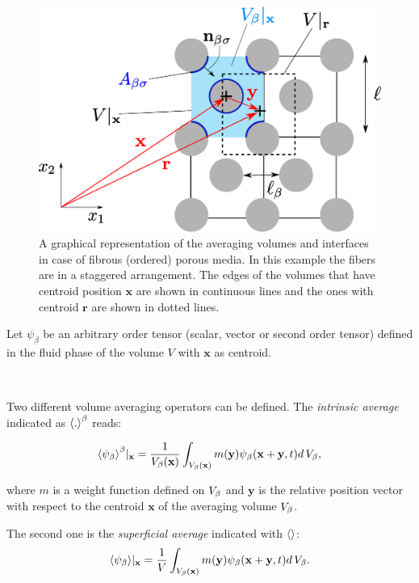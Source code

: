 \begin{figure}[h!]
	\centering
	\includegraphics[width=0.7\linewidth]{chapter_2/figure/REV}
	\caption{A graphical representation of the averaging volumes and interfaces in case of fibrous (ordered) porous media. In this example the fibers are in a staggered arrangement. The edges of the volumes that have centroid position $\mathbf{x}$ are shown in continuous lines and the ones with centroid $\mathbf{r}$ are shown in dotted lines.}
	\label{fig:rev}
\end{figure}

Let $\psi_{\beta}$ be an arbitrary order tensor (scalar, vector or second order tensor) defined in the fluid phase of the volume $V$ with $\mathbf{x}$ as centroid.

\newpage 

$\quad$

\newpage

Two different volume averaging operators can be defined. The \textit{intrinsic average} indicated as ${\left< . \right>}^{\beta}$ reads:

\begin{equation}
	{\left< \psi_{\beta} \right>}^{\beta}|_{\mathbf{x}} = \dfrac{1}{V_\beta(\mathbf{x})} \int_{V_\beta(\mathbf{x})}  m(\mathbf{y}) \psi_{\beta}(\mathbf{x}+\mathbf{y}, t) d \, V_\beta,
	\label{eq:avg_intrinsic}
\end{equation}

\noindent where $m$ is a weight function defined on $V_\beta$ and $\mathbf{y}$ is the relative position vector with respect to the centroid $\mathbf{x}$ of the averaging volume $V_\beta$.

The second one is the \textit{superficial average} indicated with ${\left<  \right>}$:
\begin{equation}
	{\left< \psi_{\beta} \right>}|_{\mathbf{x}} = \dfrac{1}{V} \int_{V_\beta(\mathbf{x})} m(\mathbf{y}) \psi_{\beta}(\mathbf{x}+\mathbf{y}, t) d \, V_\beta.
	\label{eq:avg_superficial}
\end{equation}

